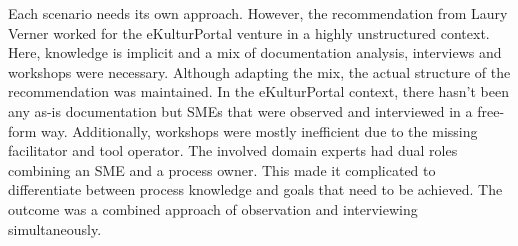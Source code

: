 Each scenario needs its own approach. However, the recommendation from Laury Verner worked for the eKulturPortal venture in a highly unstructured context. Here, knowledge is implicit and a mix of documentation analysis, interviews and workshops were necessary. Although adapting the mix, the actual structure of the recommendation was maintained. In the eKulturPortal context, there hasn't been any as-is documentation but SMEs that were observed and interviewed in a free-form way. Additionally, workshops were mostly inefficient due to the missing facilitator and tool operator. The involved domain experts had dual roles combining an SME and a process owner. This made it complicated to differentiate between process knowledge and goals that need to be achieved. 
The outcome was a combined approach of observation and interviewing simultaneously. 

